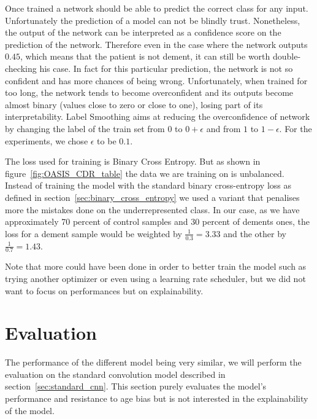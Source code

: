 Once trained a network should be able to predict the correct class for any input. Unfortunately the prediction of a model can not be blindly trust. Nonetheless, the output of the network can be interpreted as a confidence score on the prediction of the network. Therefore even in the case where the network outputs $0.45$, which means that the patient is not dement, it can still be worth double-checking his case. In fact for this particular prediction, the network is not so confident and has more chances of being wrong. Unfortunately, when trained for too long, the network tends to become overconfident and its outputs become almost binary (values close to zero or close to one), losing part of its interpretability. Label Smoothing \cite{label_smoothing_szegedy2015rethinking} aims at reducing the overconfidence of network by changing the label of the train set from $0$ to $0 + \epsilon$ and from $1$ to $1 - \epsilon$. For the experiments, we chose $\epsilon$ to be $0.1$.

The loss used for training is Binary Cross Entropy. But as shown in figure~\ref{fig:OASIS_CDR_table} the data we are training on is unbalanced. Instead of training the model with the standard binary cross-entropy loss as defined in section~\ref{sec:binary_cross_entropy} we used a variant that penalises more the mistakes done on the underrepresented class. In our case, as we have approximately 70 percent of control samples and 30 percent of dements ones, the loss for a dement sample would be weighted by $\frac{1}{0.3} = 3.33$ and the other by $\frac{1}{0.7} = 1.43$.

Note that more could have been done in order to better train the model such as trying another optimizer or even using a learning rate scheduler, but we did not want to focus on performances but on explainability.

\section{Evaluation}
The performance of the different model being very similar, we will perform the evaluation on the standard convolution model described in section~\ref{sec:standard_cnn}. This section purely evaluates the model's performance and resistance to age bias but is not interested in the explainability of the model. 



